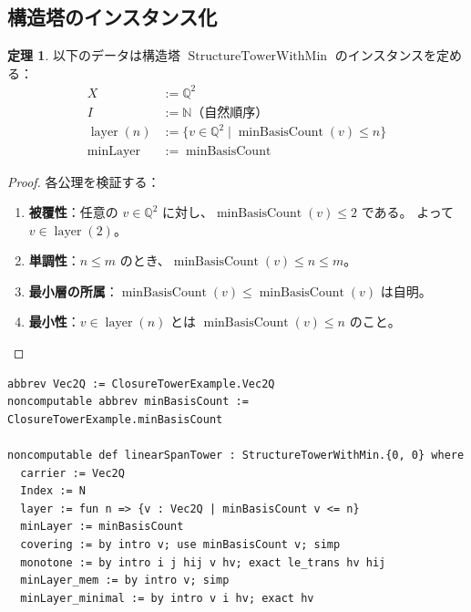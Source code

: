 \documentclass[a4paper,11pt]{ltjsarticle}
\theoremstyle{definition}
\newtheorem{theorem}[definition]{定理}
\begin{document}
\subsection{構造塔のインスタンス化}

\begin{theorem}
  以下のデータは構造塔 $\operatorname{StructureTowerWithMin}$ のインスタンスを定める：
  \begin{align*}
    X &:= \mathbb{Q}^2 \\
    I &:= \mathbb{N} \text{（自然順序）} \\
    \operatorname{layer}(n) &:= \{v \in \mathbb{Q}^2 \mid \operatorname{minBasisCount}(v) \leq n\} \\
    \operatorname{minLayer} &:= \operatorname{minBasisCount}
  \end{align*}
\end{theorem}

\begin{proof}
  各公理を検証する：
  \begin{enumerate}
    \item \textbf{被覆性}：任意の $v \in \mathbb{Q}^2$ に対し、$\operatorname{minBasisCount}(v) \leq 2$ である。
          よって $v \in \operatorname{layer}(2)$。
    \item \textbf{単調性}：$n \leq m$ のとき、$\operatorname{minBasisCount}(v) \leq n \leq m$。
    \item \textbf{最小層の所属}：$\operatorname{minBasisCount}(v) \leq \operatorname{minBasisCount}(v)$ は自明。
    \item \textbf{最小性}：$v \in \operatorname{layer}(n)$ とは $\operatorname{minBasisCount}(v) \leq n$ のこと。\qedhere
  \end{enumerate}
\end{proof}

\begin{leancode}
\begin{lstlisting}
abbrev Vec2Q := ClosureTowerExample.Vec2Q
noncomputable abbrev minBasisCount := ClosureTowerExample.minBasisCount

noncomputable def linearSpanTower : StructureTowerWithMin.{0, 0} where
  carrier := Vec2Q
  Index := N
  layer := fun n => {v : Vec2Q | minBasisCount v <= n}
  minLayer := minBasisCount
  covering := by intro v; use minBasisCount v; simp
  monotone := by intro i j hij v hv; exact le_trans hv hij
  minLayer_mem := by intro v; simp
  minLayer_minimal := by intro v i hv; exact hv
\end{lstlisting}
\end{leancode}
\end{document}
